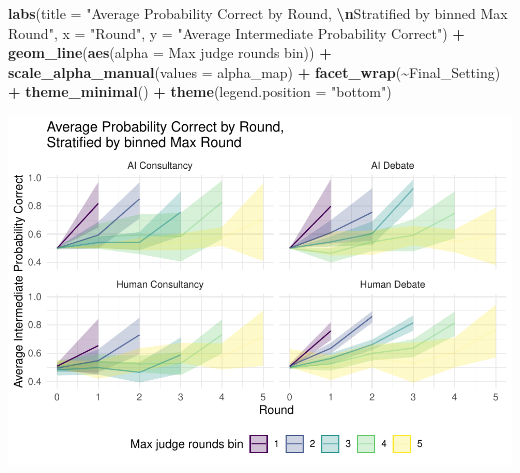 \documentclass[
]{article}
\newenvironment{Shaded}{\begin{snugshade}}{\end{snugshade}}
\newcommand{\AttributeTok}[1]{\textcolor[rgb]{0.13,0.29,0.53}{#1}}
\newcommand{\FunctionTok}[1]{\textcolor[rgb]{0.13,0.29,0.53}{\textbf{#1}}}
\newcommand{\NormalTok}[1]{#1}
\newcommand{\SpecialCharTok}[1]{\textcolor[rgb]{0.81,0.36,0.00}{\textbf{#1}}}
\newcommand{\StringTok}[1]{\textcolor[rgb]{0.31,0.60,0.02}{#1}}
\begin{document}
\begin{Shaded}
\begin{Highlighting}[]
  \FunctionTok{labs}\NormalTok{(}\AttributeTok{title =} \StringTok{"Average Probability Correct by Round, }\SpecialCharTok{\textbackslash{}n}\StringTok{Stratified by binned Max Round"}\NormalTok{,}
       \AttributeTok{x =} \StringTok{"Round"}\NormalTok{, }
       \AttributeTok{y =} \StringTok{"Average Intermediate Probability Correct"}\NormalTok{) }\SpecialCharTok{+}
  \FunctionTok{geom\_line}\NormalTok{(}\FunctionTok{aes}\NormalTok{(}\AttributeTok{alpha =} \StringTok{\textasciigrave{}}\AttributeTok{Max judge rounds bin}\StringTok{\textasciigrave{}}\NormalTok{)) }\SpecialCharTok{+}
  \FunctionTok{scale\_alpha\_manual}\NormalTok{(}\AttributeTok{values =}\NormalTok{ alpha\_map) }\SpecialCharTok{+}
  \FunctionTok{facet\_wrap}\NormalTok{(}\SpecialCharTok{\textasciitilde{}}\NormalTok{Final\_Setting) }\SpecialCharTok{+}
  \FunctionTok{theme\_minimal}\NormalTok{() }\SpecialCharTok{+}
  \FunctionTok{theme}\NormalTok{(}\AttributeTok{legend.position =} \StringTok{"bottom"}\NormalTok{)}
\end{Highlighting}
\end{Shaded}

\includegraphics{debate-2309_files/figure-latex/strat ggplot-1.pdf}
\end{document}
